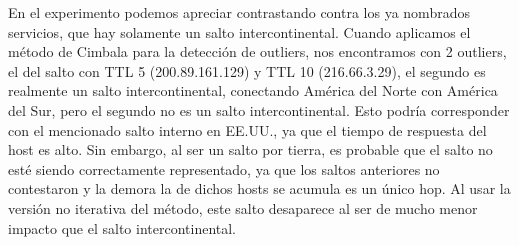 En el experimento podemos apreciar contrastando contra los ya nombrados servicios, que hay solamente un salto intercontinental. Cuando aplicamos el método de Cimbala para la detección de outliers, nos encontramos con 2 outliers, el del salto con TTL 5 (200.89.161.129) y TTL 10 (216.66.3.29), el segundo es realmente un salto intercontinental, conectando América del Norte con América del Sur, pero el segundo no es un salto intercontinental. Esto podría corresponder con el mencionado salto interno en EE.UU., ya que el tiempo de respuesta del host es alto. Sin embargo, al ser un salto por tierra, es probable que el salto no esté siendo correctamente representado, ya que los saltos anteriores no contestaron y la demora la de dichos hosts se acumula es un único hop. Al usar la versión no iterativa del método, este salto desaparece al ser de mucho menor impacto que el salto intercontinental.